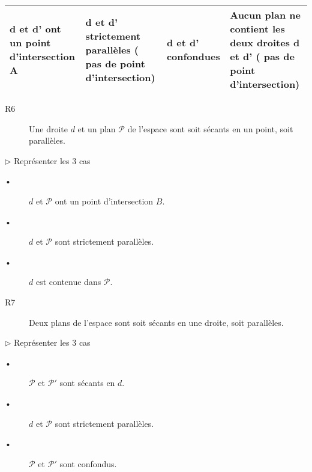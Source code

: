 \begin{Reg}
\begin{tabular}{|>{\centering\arraybackslash}p{3.75cm}|>{\centering\arraybackslash}p{3.75cm}|>{\centering\arraybackslash}p{3.75cm}|>{\centering\arraybackslash}p{3.75cm}|}
    \\ 
\hline 
d et d' ont un point d'intersection A & d et d' strictement parallèles ( pas de point d'intersection) & d et d' confondues & Aucun plan ne contient les deux droites d et d' ( pas de point d'intersection) \\ 
\hline 
\end{tabular} 
\end{Reg}

\begin{Reg}
\begin{description}
\item[R6] Une droite $d$ et un plan $\mathscr{P}$ de l'espace sont soit sécants en un point, soit parallèles.
\end{description}
\end{Reg}

$\triangleright$ Représenter les 3 cas
\begin{description}
\item[•] $d$ et $\mathscr{P}$  ont un point d'intersection $B$. 
\item[•] $d$ et $\mathscr{P}$  sont strictement parallèles.
\item[•] $d$ est contenue dans $\mathscr{P}$.
\end{description}


\begin{Reg}
\begin{description}
\item[R7] Deux plans de l'espace sont soit sécants en une droite, soit parallèles.
\end{description}
\end{Reg}

$\triangleright$ Représenter les 3 cas
\begin{description}
\item[•] $\mathscr{P}$ et $\mathscr{P}'$  sont sécants en $d$.
\item[•] $d$ et $\mathscr{P}$  sont strictement parallèles.
\item[•] $\mathscr{P}$ et $\mathscr{P}'$  sont confondus.
\end{description}



